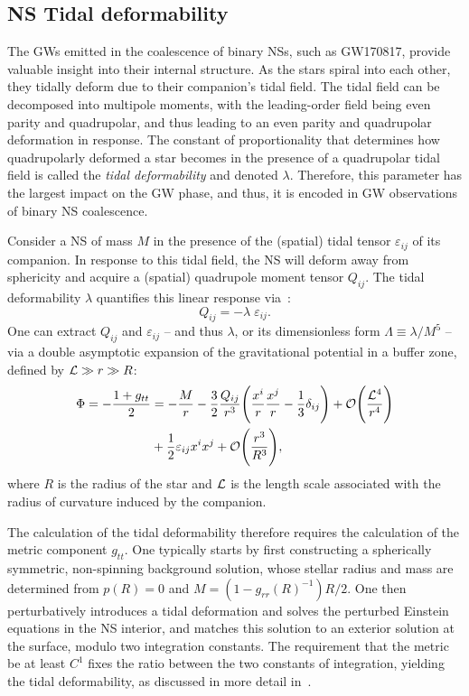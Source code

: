 \documentclass[prd,twocolumn,nofootinbib,superscriptaddress,amsmath,amssymb]{revtex4-1}
\begin{document}
\subsection{NS Tidal deformability}\label{tidal}

The GWs emitted in the coalescence of binary NSs, such as GW170817, provide valuable insight into their internal structure. As the stars spiral into each other, they tidally deform due to their companion's tidal field. The tidal field can be decomposed into multipole moments, with the leading-order field being even parity and quadrupolar, and thus leading to an even parity and quadrupolar deformation in response. The constant of proportionality that determines how quadrupolarly deformed a star becomes in the presence of a quadrupolar tidal field is called the \emph{tidal deformability} and denoted $\lambda$. Therefore, this parameter has the largest impact on the GW phase, and thus, it is encoded in GW observations of binary NS coalescence.  

Consider a NS of mass $M$ in the presence of the (spatial) tidal tensor $\varepsilon_{ij}$ of its companion. In response to this tidal field, the NS will deform away from sphericity and acquire a (spatial) quadrupole moment tensor $Q_{ij}$. The tidal deformability $\lambda$ quantifies this linear response via~\cite{Flanagan2008,hinderer-love,Yagi:ILQ}:
\begin{equation}
Q_{ij}=-\lambda \; \varepsilon_{ij}.
\end{equation}
One can extract $Q_{ij}$ and $\varepsilon_{ij}$ -- and thus $\lambda$, or its dimensionless form $\Lambda \equiv \lambda/M^5$ -- via a double asymptotic expansion of the gravitational potential in a buffer zone, defined by ${\cal{L}} \gg r \gg R$:
\begin{align}
\Phi=- \frac{1+g_{tt}}{2}&=-\frac{M}{r} - \frac{3}{2}\frac{Q_{ij}}{r^3} \Bigg(\frac{x^i}{r} \frac{x^j}{r}-\frac{1}{3}\delta_{ij} \Bigg) + \mathcal{O} \Bigg( \frac{{\cal{L}}^4}{r^4} \Bigg)
\nonumber \\ &+ \frac{1}{2} \varepsilon_{ij} x^i x^j + \mathcal{O} \Bigg( \frac{r^3}{R^3} \Bigg),
\end{align}
where $R$ is the radius of the star and ${\cal{L}}$ is the length scale associated with the radius of curvature induced by the companion. 

The calculation of the tidal deformability therefore requires the calculation of the metric component $g_{tt}$. One typically starts by first constructing a spherically symmetric, non-spinning background solution, whose stellar radius and mass are determined from $p(R)=0$ and $M=(1-g_{rr}(R)^{-1})R/2$. One then perturbatively introduces a tidal deformation and solves the perturbed Einstein equations in the NS interior, and matches this solution to an exterior solution at the surface, modulo two integration constants. The requirement that the metric be at least $C^{1}$ fixes the ratio between the two constants of integration, yielding the tidal deformability, as discussed in more detail in~\cite{hinderer-love}. 
\end{document}
